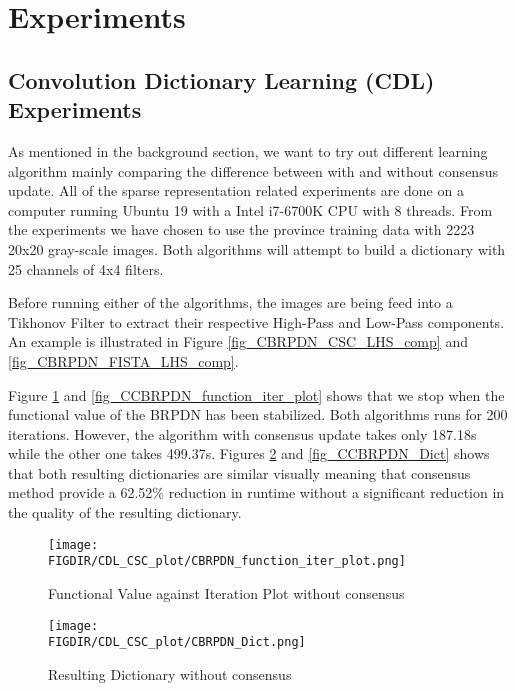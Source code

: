 
\section{Experiments}

\subsection{Convolution Dictionary Learning (CDL) Experiments}
As mentioned in the background section, we want to try out different
learning algorithm mainly comparing the difference between with and
without consensus update. All of the sparse representation related 
experiments are done on a computer running Ubuntu 19 with a Intel 
i7-6700K CPU with 8 threads.
From the experiments we have chosen to use the province training 
data with 2223 20x20 gray-scale images. Both algorithms will 
attempt to build a dictionary with 25 channels of 4x4 filters.

Before running either of the algorithms, the images are being feed
into a Tikhonov Filter to extract their respective High-Pass and Low-Pass
components. An example is illustrated in Figure \ref{fig_CBRPDN_CSC_LHS_comp} and 
\ref{fig_CBRPDN_FISTA_LHS_comp}. 

Figure \ref{fig_CBRPDN_function_iter_plot} and \ref{fig_CCBRPDN_function_iter_plot}
shows that we stop when the functional value of the BRPDN has been stabilized.
Both algorithms runs for 200 iterations. However, the algorithm with consensus update
takes only 187.18s while the other one takes 499.37s. 
Figures \ref{fig_CBRPDN_Dict} and \ref{fig_CCBRPDN_Dict} shows that both resulting 
dictionaries are similar visually meaning that consensus method provide 
a 62.52\% reduction in runtime without a significant reduction in the 
quality of the resulting dictionary.

\begin{figure}[ht]
\centering
\texttt{[image: \\FIGDIR/CDL\_CSC\_plot/CBRPDN\_function\_iter\_plot.png]}
\caption{Functional Value against Iteration Plot without consensus}
\label{fig_CBRPDN_function_iter_plot}
\end{figure}

\begin{figure}[ht]
\centering
\texttt{[image: \\FIGDIR/CDL\_CSC\_plot/CBRPDN\_Dict.png]}
\caption{Resulting Dictionary without consensus}
\label{fig_CBRPDN_Dict}
\end{figure}

